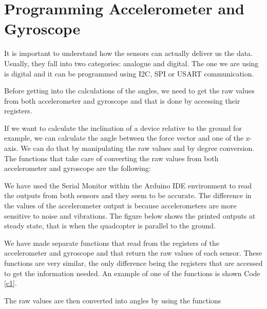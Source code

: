 \section{Programming Accelerometer and Gyroscope}

It is important to understand how the sensors can actually deliver us the data. Usually, they fall into two categories: analogue and digital. The one we are using is digital and it can be programmed using I2C, SPI or USART communication. 

Before getting into the calculations of the angles, we need to get the raw values from both accelerometer and gyroscope and that is done by accessing their registers.

If we want to calculate the inclination of a device relative to the ground for example, we can calculate the angle between the force vector and one of the z-axis. We can do that by manipulating the raw values and by degree conversion. The functions that take care of converting the raw values from both accelerometer and gyroscope are the following:

We have used the Serial Monitor within the Arduino IDE environment to read the outputs from both sensors and they seem to be accurate. The difference in the values of the accelerometer output is because accelerometers are more sensitive to noise and vibrations. The figure below shows the printed outputs at steady state, that is when the quadcopter is parallel to the ground.

We have made separate functions that read from the registers of the accelerometer and gyroscope and that return the raw values of each sensor. These functions are very similar, the only difference being the registers that are accessed to get the information needed. An example of one of the functions is shown Code \ref{c1}.



\clearpage

The raw values are then converted into angles by using the functions





